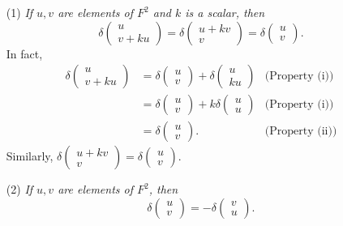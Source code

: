 \documentclass{article}
\begin{document}
\begin{enumerate}
\item[(1)]
\emph{If $u, v$ are elements of $F^2$ and $k$ is a scalar, then
$$\delta\begin{pmatrix} u \\ v + ku \end{pmatrix}
= \delta\begin{pmatrix} u + kv \\ v \end{pmatrix}
= \delta\begin{pmatrix} u \\ v \end{pmatrix}.$$}
In fact,
\begin{align*}
\delta\begin{pmatrix} u \\ v + ku \end{pmatrix}
&= \delta\begin{pmatrix} u \\ v \end{pmatrix}
   + \delta\begin{pmatrix} u \\ ku \end{pmatrix}
  &\text{(Property (i))} \\
&= \delta\begin{pmatrix} u \\ v \end{pmatrix}
   + k \delta\begin{pmatrix} u \\ u \end{pmatrix}
  &\text{(Property (i))} \\
&= \delta\begin{pmatrix} u \\ v \end{pmatrix}.
  &\text{(Property (ii))}
\end{align*}
Similarly,
$\delta\begin{pmatrix} u + kv \\ v \end{pmatrix}
= \delta\begin{pmatrix} u \\ v \end{pmatrix}$.
\item[(2)]
\emph{If $u, v$ are elements of $F^2$, then
$$\delta\begin{pmatrix} u \\ v  \end{pmatrix}
= -\delta\begin{pmatrix} v \\ u \end{pmatrix}.$$}

\end{enumerate}
\end{document}
